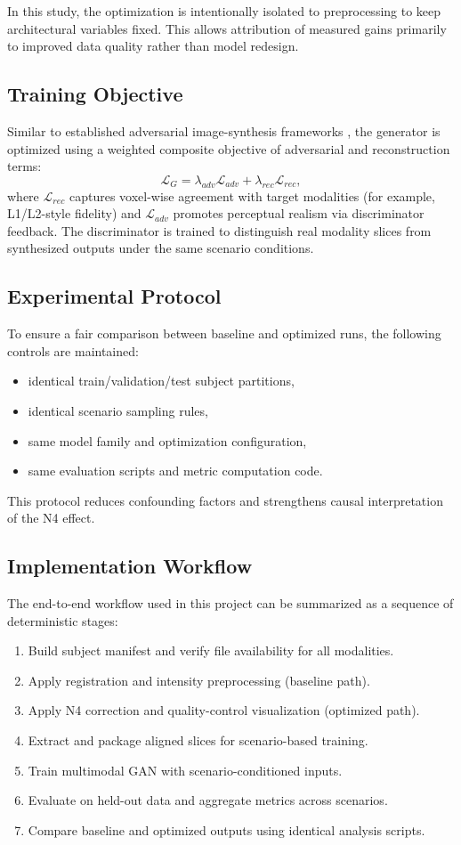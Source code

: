 \documentclass[conference]{IEEEtran}
\begin{document}
In this study, the optimization is intentionally isolated to preprocessing to keep architectural variables fixed. This allows attribution of measured gains primarily to improved data quality rather than model redesign.

\subsection{Training Objective}
Similar to established adversarial image-synthesis frameworks \cite{sharma2020missing,goodfellow2020}, the generator is optimized using a weighted composite objective of adversarial and reconstruction terms:
\begin{equation}
\mathcal{L}_{G} = \lambda_{adv}\mathcal{L}_{adv} + \lambda_{rec}\mathcal{L}_{rec},
\end{equation}
where $\mathcal{L}_{rec}$ captures voxel-wise agreement with target modalities (for example, L1/L2-style fidelity) and $\mathcal{L}_{adv}$ promotes perceptual realism via discriminator feedback. The discriminator is trained to distinguish real modality slices from synthesized outputs under the same scenario conditions.

\subsection{Experimental Protocol}
To ensure a fair comparison between baseline and optimized runs, the following controls are maintained:
\begin{itemize}
\item identical train/validation/test subject partitions,
\item identical scenario sampling rules,
\item same model family and optimization configuration,
\item same evaluation scripts and metric computation code.
\end{itemize}
This protocol reduces confounding factors and strengthens causal interpretation of the N4 effect.

\subsection{Implementation Workflow}
The end-to-end workflow used in this project can be summarized as a sequence of deterministic stages:
\begin{enumerate}
\item Build subject manifest and verify file availability for all modalities.
\item Apply registration and intensity preprocessing (baseline path).
\item Apply N4 correction and quality-control visualization (optimized path).
\item Extract and package aligned slices for scenario-based training.
\item Train multimodal GAN with scenario-conditioned inputs.
\item Evaluate on held-out data and aggregate metrics across scenarios.
\item Compare baseline and optimized outputs using identical analysis scripts.
\end{enumerate}
\end{document}
